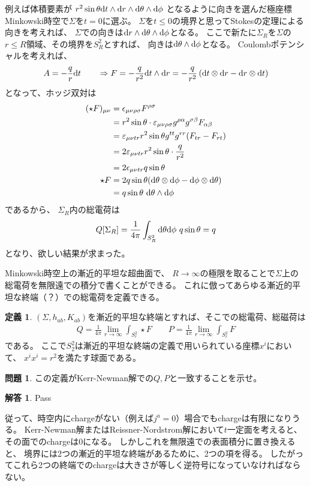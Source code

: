 \documentclass[a4paper, 12pt]{jsarticle}
\theoremstyle{definition}
\newcommand{\ddif}{{\rm d}}
\newtheorem*{definition}{定義}
\newtheorem*{exercise}{問題}
\newtheorem*{answer}{解答}
\begin{document}
例えば体積要素が
$r^2 \sin \theta \ddif t \wedge \ddif r \wedge \ddif \theta \wedge \ddif \phi$
となるように向きを選んだ極座標Minkowski時空で$\Sigma$を$t=0$に選ぶ。
$\Sigma$を$t \le 0$の境界と思ってStokesの定理による向きを考えれば、
$\Sigma$での向きは$\ddif r \wedge \ddif \theta \wedge \ddif \phi$となる。
ここで新たに$\Sigma_R$を$\Sigma$の$r \le R$領域、その境界を$S_R^2$とすれば、
向きは$\ddif \theta \wedge \ddif \phi$となる。
Coulombポテンシャルを考えれば、
\begin{align}
	A = -\frac{q}{r} \ddif t \qquad \Rightarrow
	F = -\frac{q}{r^2} \ddif t \wedge \ddif r
	= -\frac{q}{r^2}
	\left( \ddif t \otimes \ddif r - \ddif r \otimes \ddif t \right)
\end{align}
となって、ホッジ双対は
\begin{align}
	(\star F)_{\mu \nu} &= \epsilon_{\mu \nu \rho \sigma} F^{\rho \sigma} \\
	&= r^2 \sin \theta \cdot \varepsilon_{\mu \nu \rho \sigma}
	g^{\rho \alpha} g^{\sigma \beta} F_{\alpha \beta} \\
	&= \varepsilon_{\mu \nu t r} r^2 \sin \theta
	g^{tt} g^{rr} (F_{tr} - F_{rt}) \\
	&= 2 \varepsilon_{\mu \nu t r} r^2 \sin \theta \cdot \frac{q}{r^2} \\
	&= 2 \epsilon_{\mu \nu t r} q \sin \theta \\
	\star F &= 2 q \sin \theta
	(\ddif \theta \otimes \ddif \phi - \ddif \phi \otimes \ddif \theta) \\
	&= q \sin \theta \ \ddif \theta \wedge \ddif \phi
\end{align}
であるから、
$\Sigma_R$内の総電荷は
\begin{align}
	Q[\Sigma_R]
	= \frac{1}{4\pi} \int_{S_R^2} \ddif \theta \ddif \phi \ q \sin \theta
	= q
\end{align}
となり、欲しい結果が求まった。

Minkowski時空上の漸近的平坦な超曲面で、
$R \to \infty$の極限を取ることで$\Sigma$上の総電荷を無限遠での積分で書くことができる。
これに倣ってあらゆる漸近的平坦な終端（？）での総電荷を定義できる。
\begin{definition}
	$(\Sigma, h_{ab}, K_{ab})$を漸近的平坦な終端とすれば、そこでの総電荷、総磁荷は
	\begin{align}
		Q = \frac{1}{4\pi} \lim_{r \to \infty} \int_{S_r^2} \star F \qquad
		P = \frac{1}{4\pi} \lim_{r \to \infty} \int_{S_r^2} F
	\end{align}
	である。
	ここで$S_2^2$は漸近的平坦な終端の定義で用いられている座標$x^i$において、
	$x^i x^i = r^2$を満たす球面である。
\end{definition}
\begin{exercise}
	この定義がKerr-Newman解での$Q, P$と一致することを示せ。
\end{exercise}
\begin{answer}
	Pass
\end{answer}

従って、時空内にchargeがない（例えば$j^a = 0$）場合でもchargeは有限になりうる。
Kerr-Newman解またはReissner-Nordstrom解において$t$一定面を考えると、
その面でのchargeは0になる。
しかしこれを無限遠での表面積分に置き換えると、
境界には2つの漸近的平坦な終端があるために、2つの項を得る。
したがってこれら2つの終端でのchargeは大きさが等しく逆符号になっていなければならない。
\end{document}
